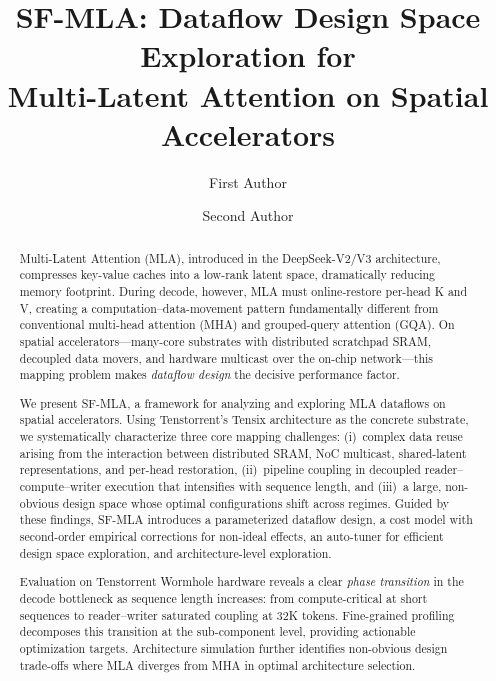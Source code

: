 \documentclass[sigconf, review, anonymous]{acmart}
\newcommand{\brand}{SF-MLA}
\newcommand{\sysname}{\textsc{\brand}\xspace}
\newcommand{\phaseTransition}{phase transition}
\newcommand{\autoTuner}{auto-tuner}
\begin{document}
\title{\brand: Dataflow Design Space Exploration for\\Multi-Latent Attention on Spatial Accelerators}

\author{First Author}

\author{Second Author}

\renewcommand{\shortauthors}{Author et al.}

\begin{abstract}

Multi-Latent Attention (MLA), introduced in the DeepSeek-V2/V3
architecture, compresses key-value caches into a low-rank latent space,
dramatically reducing memory footprint.  During decode, however, MLA
must online-restore per-head K and V, creating a
computation--data-movement pattern fundamentally different from
conventional multi-head attention (MHA) and grouped-query attention
(GQA).  On spatial accelerators---many-core substrates with distributed
scratchpad SRAM, decoupled data movers, and hardware multicast over the
on-chip network---this mapping problem makes \emph{dataflow design} the
decisive performance factor.

We present \sysname, a framework for analyzing and exploring MLA
dataflows on spatial accelerators.  Using Tenstorrent's Tensix
architecture as the concrete substrate, we systematically characterize
three core mapping challenges: (i)~complex data reuse arising from the
interaction between distributed SRAM, NoC multicast, shared-latent
representations, and per-head restoration, (ii)~pipeline coupling in
decoupled reader--compute--writer execution that intensifies with
sequence length, and (iii)~a large, non-obvious design space whose
optimal configurations shift across regimes.  Guided by these findings,
\sysname introduces a parameterized dataflow design, a cost model with
second-order empirical corrections for non-ideal effects, an \autoTuner{}
for efficient design space exploration, and architecture-level
exploration.

Evaluation on Tenstorrent Wormhole hardware reveals a clear
\emph{\phaseTransition} in the decode bottleneck as sequence length
increases: from compute-critical at short sequences to
reader--writer saturated coupling at 32K tokens.  Fine-grained profiling
decomposes this transition at the sub-component level, providing
actionable optimization targets.
Architecture simulation further
identifies non-obvious design trade-offs where MLA diverges from MHA
in optimal architecture selection.

\end{abstract}
\end{document}
